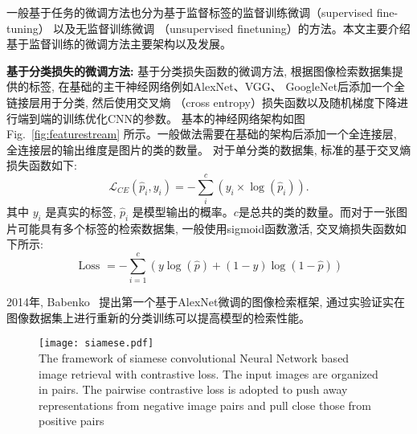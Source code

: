 一般基于任务的微调方法也分为基于监督标签的监督训练微调（supervised fine-tuning） 以及无监督训练微调 （unsupervised finetuning）的方法。本文主要介绍基于监督训练的微调方法主要架构以及发展。\par
\textbf{基于分类损失的微调方法:} 基于分类损失函数的微调方法, 根据图像检索数据集提供的标签, 在基础的主干神经网络例如AlexNet、VGG、 GoogleNet后添加一个全链接层用于分类, 然后使用交叉熵 （cross entropy）损失函数以及随机梯度下降进行端到端的训练优化CNN的参数。 基本的神经网络架构如图Fig.~\ref{fig:featurestream} 所示。一般做法需要在基础的架构后添加一个全连接层, 全连接层的输出维度是图片的类的数量。 对于单分类的数据集, 标准的基于交叉熵损失函数如下:
\begin{equation}
    \mathcal{L}_{C E}\left(\hat{p}_i, y_i\right)=-\sum_i^c\left(y_i \times \log \left(\hat{p}_i\right)\right).
\end{equation}
其中 $y_i$ 是真实的标签, $\hat{p}_i$ 是模型输出的概率。$c$是总共的类的数量。而对于一张图片可能具有多个标签的检索数据集, 一般使用sigmoid函数激活, 交叉熵损失函数如下所示:
\begin{equation}
    \text { Loss }=-\sum_{i=1}^c(y \log (\hat{p})+(1-y) \log (1-\hat{p}))
\end{equation} \par
2014年, Babenko~\cite{babenko2014neural} 提出第一个基于AlexNet微调的图像检索框架, 通过实验证实在图像数据集上进行重新的分类训练可以提高模型的检索性能。 \par

\begin{figure}[!htp]
    \centering
    \texttt{[image: siamese.pdf]} \\
      {The framework of siamese convolutional Neural Network based image retrieval with contrastive loss. The input images are organized in pairs. The pairwise contrastive loss is adopted to push away representations from negative image pairs and pull close those from positive pairs }
   \label{fig:siamese}
\end{figure}

